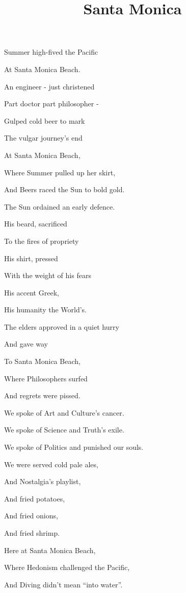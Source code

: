 \documentclass{article}
\title{Santa Monica}
\begin{document}
 \newline

Summer high-fived the Pacific 

At Santa Monica Beach.

An engineer - just christened 

Part doctor part philosopher - 

Gulped cold beer to mark 

The vulgar journey's end

At Santa Monica Beach, 

Where Summer pulled up her skirt,

And Beers raced the Sun to bold gold.

\newline \newline

The Sun ordained an early defence.

His beard, sacrificed 

To the fires of propriety

His shirt, pressed 

With the weight of his fears

His accent Greek, 

His humanity the World's.

The elders approved in a quiet hurry 

And gave way 

To Santa Monica Beach,

Where Philosophers surfed

And regrets were pissed.

\newline \newline

We spoke of Art and Culture's cancer.

We spoke of Science and Truth's exile.

We spoke of Politics and punished our souls.

We were served cold pale ales,

And Nostalgia's playlist,

And fried potatoes,

And fried onions,

And fried shrimp.

Here at Santa Monica Beach,

Where Hedonism challenged the Pacific,

And Diving didn't mean ``into water''.

\newline \newline
\end{document}
